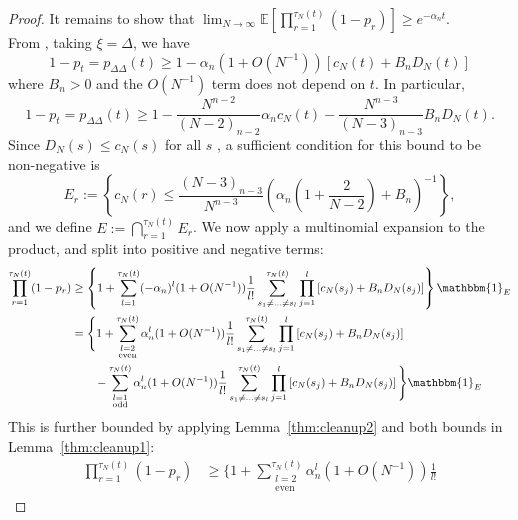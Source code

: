 \documentclass{article}
\newcommand{\E}{\mathbb{E}}
\newcommand{\1}[1]{\mathbbm{1}_{#1}}
\begin{document}
\begin{proof}
It remains to show that
$\lim_{N\to\infty}\E\left[ \prod_{r=1}^{\tau_N(t)} (1-p_r) \right] 
\geq e^{-\alpha_n t}$.\\
From \citet[Equation (3.14)]{brown2021}, taking $\xi=\Delta$, we have
\begin{equation}
1-p_t 
= p_{\Delta\Delta}(t) \geq 1 - \alpha_n (1+O(N^{-1})) 
        \left[c_N(t) + B_n D_N(t) \right]
\end{equation}
where $B_n >0$ and the $O(N^{-1})$ term does not depend on $t$.
In particular,
\begin{equation}
1-p_t
= p_{\Delta\Delta}(t) \geq 1 - \frac{N^{n-2}}{(N-2)_{n-2}} \alpha_n c_N(t) 
        - \frac{N^{n-3}}{(N-3)_{n-3}} B_n D_N(t) .
\end{equation}
Since $D_N(s) \leq c_N(s)$ for all $s$ \citep[p.9]{koskela2018}, a sufficient condition for this bound to be non-negative is
\begin{equation}\label{eq:025}
E_r 
:= \left\{ c_N(r) \leq \frac{(N-3)_{n-3}}{N^{n-3}} 
        \left( \alpha_n \left(1 + \frac{2}{N-2} \right) + B_n \right)^{-1} \right\} ,
\end{equation}
and we define $E := \bigcap_{r=1}^{\tau_N(t)} E_r$.
We now apply a multinomial expansion to the product, and split into positive and negative terms:
\begin{align}
\prod_{r=1}^{\tau_N(t)} (1-p_r)
&\geq \left\{ 1 + \sum_{l=1}^{\tau_N(t)} (-\alpha_n)^l (1+O(N^{-1})) 
        \frac{1}{l!} \sum_{s_1\neq\dots\neq s_l}^{\tau_N(t)}\prod_{j=1}^l
        \left[ c_N(s_j) + B_n D_N(s_j) \right] \right\} \1{E} \notag\\
&= \Bigg\{ 1 + \sum_{\substack{l=2 \\ \text{even} }}^{\tau_N(t)} 
        \alpha_n^l (1+O(N^{-1})) \frac{1}{l!} 
        \sum_{s_1\neq\dots\neq s_l}^{\tau_N(t)}\prod_{j=1}^l
        \left[ c_N(s_j) + B_n D_N(s_j) \right] \notag\\
    &\qquad- \sum_{\substack{l=1 \\ \text{odd} }}^{\tau_N(t)} 
        \alpha_n^l (1+O(N^{-1})) \frac{1}{l!}
        \sum_{s_1\neq\dots\neq s_l}^{\tau_N(t)}\prod_{j=1}^l
        \left[ c_N(s_j) + B_n D_N(s_j) \right] \Bigg\} \1{E}
\end{align}
This is further bounded by applying Lemma~\ref{thm:cleanup2} and both bounds in Lemma~\ref{thm:cleanup1}:
\begin{align}
\prod_{r=1}^{\tau_N(t)} (1-p_r)
&\geq \Bigg\{ 1 + \sum_{\substack{l=2 \\ \text{even} }}^{\tau_N(t)} 
        \alpha_n^l (1+O(N^{-1})) \frac{1}{l!} 

\end{align}
\end{proof}
\end{document}
